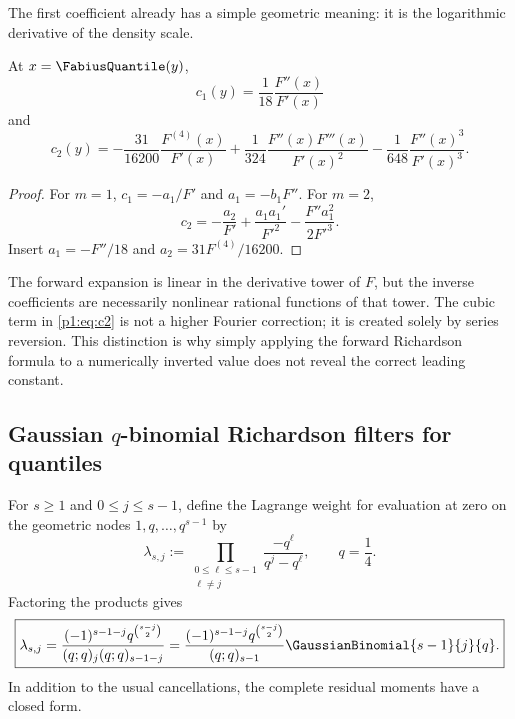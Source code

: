 \documentclass[11pt,oneside]{article}
\numberwithin{equation}{section}
\theoremstyle{definition}
\theoremstyle{remark}
\begin{document}
The first coefficient already has a simple geometric meaning: it is the logarithmic
derivative of the density scale.

\begin{corollary}
\label{p1:cor:c1-c2}
At $x=\FabiusQuantile(y)$,
\begin{equation}
 \boxed{c_1(y)=\frac1{18}\frac{F''(x)}{F'(x)}}
 \label{p1:eq:c1}
\end{equation}
and
\begin{equation}
 \boxed{
 c_2(y)=
 -\frac{31}{16200}\frac{F^{(4)}(x)}{F'(x)}
 +\frac1{324}\frac{F''(x)F'''(x)}{F'(x)^2}
 -\frac1{648}\frac{F''(x)^3}{F'(x)^3}.}
 \label{p1:eq:c2}
\end{equation}
\end{corollary}

\begin{proof}
For $m=1$, $c_1=-a_1/F'$ and $a_1=-b_1F''$.  For $m=2$,
\[
 c_2=-\frac{a_2}{F'}+\frac{a_1a_1'}{F'^2}
 -\frac{F''a_1^2}{2F'^3}.
\]
Insert $a_1=-F''/18$ and $a_2=31F^{(4)}/16200$.
\end{proof}

\begin{remark}
The forward expansion is linear in the derivative tower of $F$, but the inverse
coefficients are necessarily nonlinear rational functions of that tower.  The cubic
term in \eqref{p1:eq:c2} is not a higher Fourier correction; it is created solely by
series reversion.  This distinction is why simply applying the forward Richardson
formula to a numerically inverted value does not reveal the correct leading constant.
\end{remark}

\subsection{Gaussian \texorpdfstring{$q$}{q}-binomial Richardson filters for quantiles}

For $s\ge1$ and $0\le j\le s-1$, define the Lagrange weight for evaluation at
zero on the geometric nodes $1,q,\ldots,q^{s-1}$ by
\begin{equation}
 \lambda_{s,j}:=
 \prod_{\substack{0\le\ell\le s-1\\\ell\ne j}}
 \frac{-q^\ell}{q^j-q^\ell},
 \qquad q=\frac14.
 \label{p1:eq:lambda-def}
\end{equation}
Factoring the products gives
\begin{equation}
 \boxed{
 \lambda_{s,j}=
 \frac{(-1)^{s-1-j}q^{\binom{s-j}{2}}}
 {(q;q)_j(q;q)_{s-1-j}}
 =\frac{(-1)^{s-1-j}q^{\binom{s-j}{2}}}{(q;q)_{s-1}}
 \GaussianBinomial{s-1}{j}{q}.}
 \label{p1:eq:lambda-qbinom}
\end{equation}
In addition to the usual cancellations, the complete residual moments have a closed
form.
\end{document}
